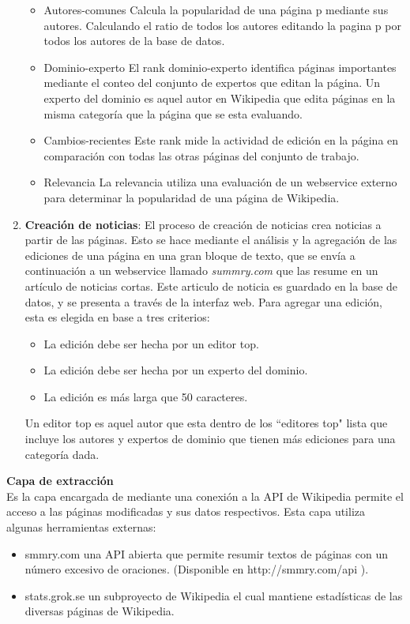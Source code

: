 \begin{enumerate}
\begin{itemize}
		\item Autores-comunes
		Calcula la popularidad de una página p mediante sus autores. Calculando el ratio de todos los autores editando la pagina p por todos los autores de la base de datos.
		
		\item Dominio-experto
		El rank dominio-experto identifica páginas importantes mediante el conteo del conjunto de expertos que editan la página. Un experto del dominio es aquel autor en Wikipedia que edita páginas en la misma categoría que la página que se esta evaluando.
		
		\item Cambios-recientes
		Este rank mide la actividad de edición en la página en comparación con todas las otras páginas del conjunto de trabajo.
		\item Relevancia
		La relevancia utiliza una evaluación de un webservice externo para determinar la popularidad de una página de Wikipedia.	
	\end{itemize}
	\item \textbf{Creación de noticias}:
	El proceso de creación de noticias crea noticias a partir de las páginas. Esto se hace mediante el análisis y la agregación de las ediciones de una página en una gran bloque de texto, que se envía a continuación a un webservice llamado \emph{summry.com} que las resume en un artículo de noticias cortas. Este articulo de noticia es guardado en la base de datos, y se presenta a través de la interfaz web.
	Para agregar una edición, esta es elegida en base a tres criterios:
	\begin{itemize}
		\item La edición debe ser hecha por un editor top.
		\item La edición debe ser hecha por un experto del dominio.
		\item La edición es más larga que 50 caracteres.
	\end{itemize}
	Un editor top es aquel autor que esta dentro de los ``editores top" lista que incluye los autores y expertos de dominio que tienen más ediciones para una categoría dada.
\end{enumerate}

\textbf{Capa de extracción}\\
Es la capa encargada de mediante una conexión a la API de Wikipedia permite el acceso a las páginas modificadas y sus datos
respectivos.
Esta capa utiliza algunas herramientas externas:
\begin{itemize}
	\item smmry.com una API abierta que permite resumir textos de páginas con un número excesivo de oraciones. (Disponible en http://smmry.com/api ).
	\item stats.grok.se un subproyecto de Wikipedia el cual mantiene estadísticas de las diversas páginas de Wikipedia.
\end{itemize} 


